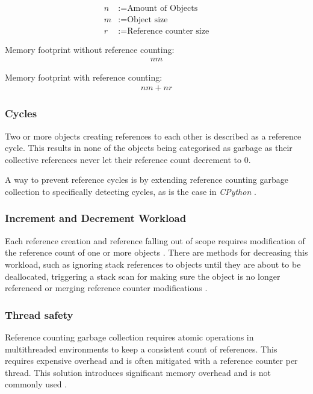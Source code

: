\begin{align*}
n &:= \textrm{Amount of Objects}\\
m &:= \textrm{Object size} \\
r &:= \textrm{Reference counter size}
\end{align*}

Memory footprint without reference counting:
\begin{align*}
nm 
\end{align*}

Memory footprint with reference counting:
\begin{align*}
nm + nr
\end{align*}

\subsubsection{Cycles}

Two or more objects creating references to each other is described as a
reference cycle. This results in none of the objects being categorised as
garbage as their collective references never let their reference count
decrement to 0. 

A way to prevent reference cycles is by extending reference counting garbage
collection to specifically detecting cycles, as is the case in \textit{CPython}
\cite[1.10 Reference Counts]{python-extending-gc_2008}. 

\subsubsection{Increment and Decrement Workload}

Each reference creation and reference falling out of scope requires
modification of the reference count of one or more objects \cite[6.1 Immediate
Reference Counting]{gc-generational-scavenging_1984}. There are methods for
decreasing this workload, such as ignoring stack references to objects until
they are about to be deallocated, triggering a stack scan for making sure the
object is no longer referenced \cite[6.2 Deferred Reference
Couting]{gc-generational-scavenging_1984} or merging reference counter
modifications \cite[Abstract]{gc-on-the-fly_2006}.

\subsubsection{Thread safety}

Reference counting garbage collection requires atomic operations in
multithreaded environments to keep a consistent count of references. This
requires expensive overhead and is often mitigated with a reference counter per
thread. This solution introduces significant memory overhead and is not
commonly used \cite[1.2 Reference-Counting on a
Multiprocessor]{gc-on-the-fly_2006}.

